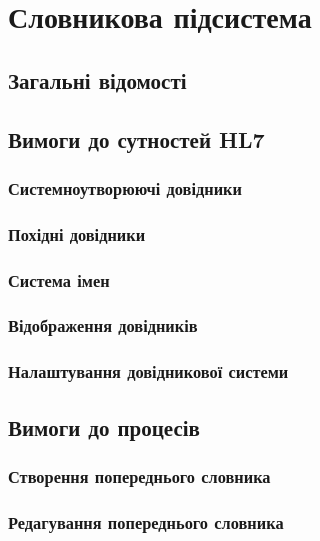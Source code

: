 \newpage
\section{Словникова підсистема}

\subsection{Загальні відомості}

\subsection{Вимоги до сутностей HL7}

\subsubsection{Системноутворюючі довідники}

\subsubsection{Похідні довідники}

\subsubsection{Система імен}

\subsubsection{Відображення довідників}

\subsubsection{Налаштування довідникової системи}

\subsection{Вимоги до процесів}

\subsubsection{Створення попереднього словника}

\subsubsection{Редагування попереднього словника}

